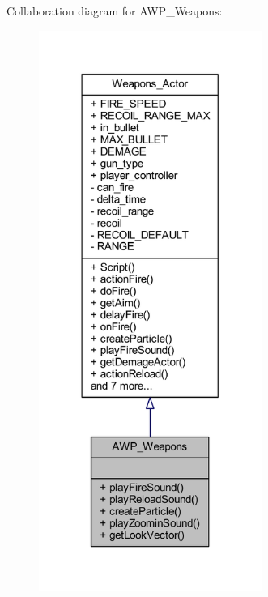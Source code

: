 Collaboration diagram for A\+W\+P\+\_\+\+Weapons\+:\nopagebreak
\begin{figure}[H]
\begin{center}
\leavevmode
\includegraphics[width=206pt]{class_a_w_p___weapons__coll__graph}
\end{center}
\end{figure}
